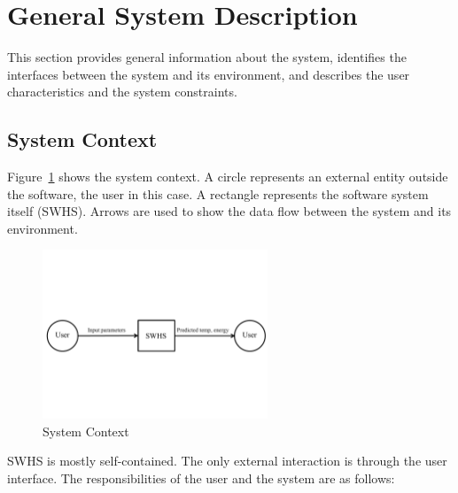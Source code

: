 \documentclass[12pt]{article}
\newcommand{\progname}{SWHS}
\begin{document}

\section{General System Description}

This section provides general information about the system,
identifies the interfaces between the system and its environment, and describes the
user characteristics and the system constraints.

\subsection{System Context}

Figure~\ref{Fig_SystemContext} shows the system context.  A circle represents an
external entity outside the software, the user in this case.  A rectangle
represents the software system itself (\progname{}).  Arrows are used to show the data
flow between the system and its environment.

\begin{figure}[h!]
\begin{center}
 \includegraphics[width=0.6\textwidth]{SystemContextFigure}
\caption{System Context}
\label{Fig_SystemContext} 
\end{center}
\end{figure}

\progname{} is mostly self-contained.  The only external interaction is through
the user interface.  The responsibilities of the user and the system are as
follows:
\end{document}
